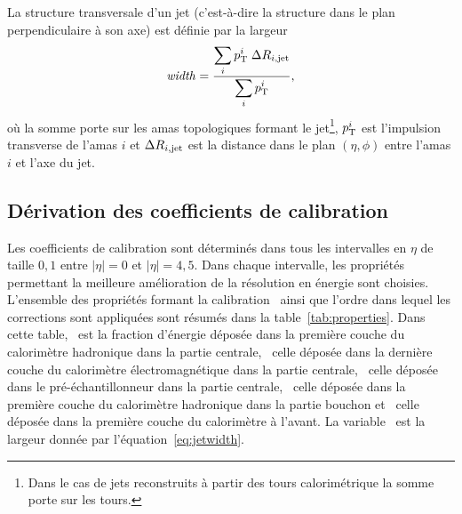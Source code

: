 La structure transversale d'un jet (c'est-\`a-dire la structure dans le plan perpendiculaire \`a son axe) est d\'efinie par la largeur
\begin{equation}
{\rm\it width} = \frac{\displaystyle \sum_{i} p^i_{\rm T} \; \Delta R_{i,{\rm jet}}} {\displaystyle \sum_{i} p^i_{\rm T}},
\label{eq:jetwidth}
\end{equation}
o\`u la somme porte sur les amas topologiques formant le jet\footnote{Dans le cas de jets reconstruits \`a partir des tours calorim\'etrique la somme porte sur les tours.}, $p^i_{\rm T}$ est l'impulsion transverse de l'amas $i$ et $\Delta R_{i,{\rm jet}}$ est la distance dans le plan $\left(\eta,\phi\right)$ entre l'amas $i$ et l'axe du jet.

\subsection{D\'erivation des coefficients de calibration}

Les coefficients de calibration sont d\'etermin\'es dans tous les intervalles en $\eta$ de taille $0,1$ entre $|\eta|=0$ et $|\eta|=4,5$. Dans chaque intervalle, les propri\'et\'es permettant la meilleure am\'elioration de la r\'esolution en \'energie sont choisies. L'ensemble des propri\'et\'es formant la calibration \GS~ainsi que l'ordre dans lequel les corrections sont appliqu\'ees sont r\'esum\'es dans la table~\ref{tab:properties}. Dans cette table, \ftile~est la fraction d'\'energie d\'epos\'ee dans la premi\`ere couche du calorim\`etre hadronique dans la partie centrale,  \fem~celle d\'epos\'ee dans la derni\`ere couche du calorim\`etre \'electromagn\'etique dans la partie centrale, \fpres~celle d\'epos\'ee dans le pr\'e-\'echantillonneur dans la partie centrale, \fhec~celle d\'epos\'ee dans la premi\`ere couche du calorim\`etre hadronique dans la partie bouchon et \ffcal~celle d\'epos\'ee dans la premi\`ere couche du calorim\`etre \`a l'avant. La variable \width~est la largeur donn\'ee par l'\'equation~\ref{eq:jetwidth}. 

